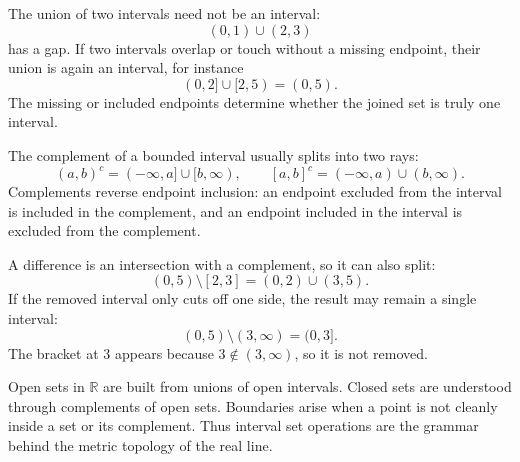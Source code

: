 \begin{remark*}
The union of two intervals need not be an interval:
\[
(0,1)\cup(2,3)
\]
has a gap. If two intervals overlap or touch without a missing endpoint, their
union is again an interval, for instance
\[
(0,2]\cup[2,5)=(0,5).
\]
The missing or included endpoints determine whether the joined set is truly
one interval.
\end{remark*}

\begin{remark*}
The complement of a bounded interval usually splits into two rays:
\[
(a,b)^c=(-\infty,a]\cup[b,\infty),
\qquad
[a,b]^c=(-\infty,a)\cup(b,\infty).
\]
Complements reverse endpoint inclusion: an endpoint excluded from the interval
is included in the complement, and an endpoint included in the interval is
excluded from the complement.
\end{remark*}

\begin{remark*}
A difference is an intersection with a complement, so it can also split:
\[
(0,5)\setminus[2,3]=(0,2)\cup(3,5).
\]
If the removed interval only cuts off one side, the result may remain a single
interval:
\[
(0,5)\setminus(3,\infty)=(0,3].
\]
The bracket at $3$ appears because $3\notin(3,\infty)$, so it is not removed.
\end{remark*}

\begin{remark*}
Open sets in $\mathbb{R}$ are built from unions of open intervals. Closed sets
are understood through complements of open sets. Boundaries arise when a point
is not cleanly inside a set or its complement. Thus interval set operations are
the grammar behind the metric topology of the real line.
\end{remark*}
